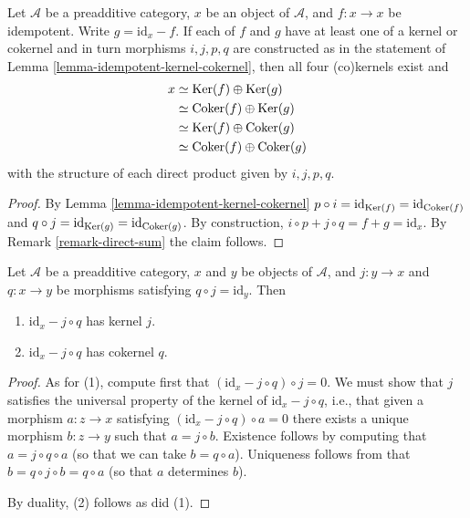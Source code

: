 \begin{lemma}
\label{lemma-idempotent-splitting}
Let $\mathcal{A}$ be a preadditive category,
$x$ be an object of $\mathcal{A}$,
and $f : x \to x$ be idempotent.
Write $g = \text{id} _ x - f$.
If each of $f$ and $g$ have at least one of a kernel or cokernel
and in turn morphisms $i , j , p , q$ are constructed
as in the statement of Lemma \ref{lemma-idempotent-kernel-cokernel},
then all four (co)kernels exist and
\begin{align*}
x
& \simeq \mathop{\mathrm{Ker}} (f) \oplus \mathop{\mathrm{Ker}} (g) \\
& \simeq \mathop{\mathrm{Coker}} (f) \oplus \mathop{\mathrm{Ker}} (g) \\
& \simeq \mathop{\mathrm{Ker}} (f) \oplus \mathop{\mathrm{Coker}} (g) \\
& \simeq \mathop{\mathrm{Coker}} (f) \oplus \mathop{\mathrm{Coker}} (g)
\end{align*}
with the structure of each direct product given by $i , j , p , q$.
\end{lemma}

\begin{proof}
By Lemma \ref{lemma-idempotent-kernel-cokernel}
$p \circ i = \text{id} _ {\mathop{\mathrm{Ker}} (f)} = \text{id} _ {\mathop{\mathrm{Coker}} (f)}$
and $q \circ j = \text{id} _ {\mathop{\mathrm{Ker}} (g)} = \text{id} _ {\mathop{\mathrm{Coker}} (g)}$.
By construction, $i \circ p + j \circ q = f + g = \text{id} _ x$.
By Remark \ref{remark-direct-sum} the claim follows.
\end{proof}

\begin{lemma}
\label{lemma-split-morphism-kernel-cokernel}
Let $\mathcal{A}$ be a preadditive category,
$x$ and $y$ be objects of $\mathcal{A}$,
and $j : y \to x$ and $q : x \to y$ be morphisms
satisfying $q \circ j = \text{id} _ y$.
Then
\begin{enumerate}
\item $\text{id} _ x - j \circ q$ has kernel $j$.
\item $\text{id} _ x - j \circ q$ has cokernel $q$.
\end{enumerate}
\end{lemma}

\begin{proof}
As for (1), compute first that $(\text{id} _ x - j \circ q) \circ j = 0$.
We must show that $j$ satisfies the universal property
of the kernel of $\text{id} _ {x} - j \circ q$,
i.e., that given a morphism $a : z \to x$
satisfying $(\text{id} _ x - j \circ q) \circ a = 0$
there exists a unique morphism $b : z \to y$
such that $a = j \circ b$.
Existence follows by computing that $a = j \circ q \circ a$
(so that we can take $b = q \circ a$).
Uniqueness follows from that $b = q \circ j \circ b = q \circ a$
(so that $a$ determines $b$).

\medskip\noindent
By duality, (2) follows as did (1).
\end{proof}

